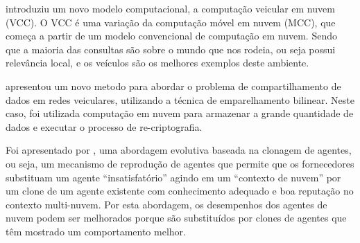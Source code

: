 \documentclass[
	12pt,				%
	oneside,			%
	a4paper,			%
	english,			%
	brazil				%
	]{abntex2ppgsi}
\begin{document}
  introduziu um novo modelo computacional, a computação veicular em nuvem  (VCC). O VCC é uma variação da computação móvel em nuvem (MCC), que começa a partir de um modelo convencional de computação em nuvem. Sendo que a maioria das consultas são sobre o mundo que nos rodeia, ou seja possui relevância local, e os veículos são os melhores exemplos deste ambiente.

 apresentou um novo metodo para abordar o problema de compartilhamento de dados em redes veiculares, utilizando a técnica de emparelhamento bilinear. Neste caso, foi utilizada computação em nuvem para armazenar a grande quantidade de dados e executar o processo de re-criptografia.

 Foi apresentado por  , uma abordagem evolutiva baseada na clonagem de agentes, ou seja, um mecanismo de reprodução de agentes que permite que os fornecedores substituam um agente ``insatisfatório'' agindo em um ``contexto de nuvem'' por um clone de um agente existente com conhecimento adequado e boa reputação no contexto multi-nuvem. Por esta abordagem, os desempenhos dos agentes de nuvem podem ser melhorados porque são substituídos por clones de agentes que têm mostrado um comportamento melhor.
\end{document}
